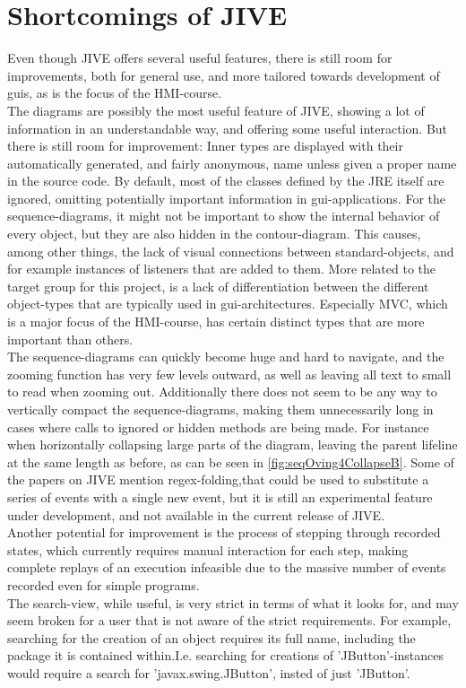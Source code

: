 \section{Shortcomings of JIVE}\label{jiveShortcomings}

Even though JIVE offers several useful features, there is still room for improvements, both for general use, and more tailored towards development of \gls{gui}s, as is the focus of the HMI-course.
~\\

The diagrams are possibly the most useful feature of JIVE, showing a lot of information in an understandable way, and offering some useful interaction.
But there is still room for improvement:
Inner types are displayed with their automatically generated, and fairly anonymous, name unless given a proper name in the source code.
By default, most of the classes defined by the JRE itself are ignored, omitting potentially important information in \gls{gui}-applications.
For the sequence-diagrams, it might not be important to show the internal behavior of every object, but they are also hidden in the contour-diagram.
This causes, among other things, the lack of visual connections between standard-objects, and for example instances of listeners that are added to them.
More related to the target group for this project, is a lack of differentiation between the different object-types that are typically used in \gls{gui}-architectures.
Especially MVC, which is a major focus of the HMI-course, has certain distinct types that are more important than others.
~\\

The sequence-diagrams can quickly become huge and hard to navigate, and the zooming function has very few levels outward, as well as leaving all text to small to read when zooming out.
Additionally there does not seem to be any way to vertically compact the sequence-diagrams, making them unnecessarily long in cases where calls to ignored or hidden methods are being made.
For instance when horizontally collapsing large parts of the diagram, leaving the parent lifeline at the same length as before, as can be seen in \autoref{fig:seqOving4CollapseB}.
Some of the papers on JIVE mention regex-folding,that could be used to substitute a series of events with a single new event, but it is still an experimental feature under development, and not available in the current release of JIVE.
~\\

Another potential for improvement is the process of stepping through recorded states, which currently requires manual interaction for each step, making complete replays of an execution infeasible due to the massive number of events recorded even for simple programs.
~\\

The search-view, while useful, is very strict in terms of what it looks for, and may seem broken for a user that is not aware of the strict requirements.
For example, searching for the creation of an object requires its full name, including the package it is contained within.I.e. searching for creations of 'JButton'-instances would require a search for 'javax.swing.JButton', insted of just 'JButton'.
~\\